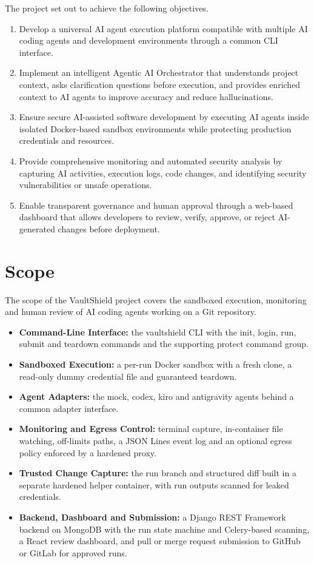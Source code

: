 \documentclass[12pt,a4paper,oneside]{report}
\providecommand{\tightlist}{\setlength{\itemsep}{0pt}\setlength{\parskip}{0pt}}
\begin{document}
The project set out to achieve the following objectives.
\begin{enumerate}
\def\labelenumi{\arabic{enumi}.}
\tightlist
\item
  Develop a universal AI agent execution platform compatible with multiple AI coding agents and development environments through a common CLI interface.
\item
  Implement an intelligent Agentic AI Orchestrator that understands project context, asks clarification questions before execution, and provides enriched context to AI agents to improve accuracy and reduce hallucinations.
\item
  Ensure secure AI-assisted software development by executing AI agents inside isolated Docker-based sandbox environments while protecting production credentials and resources.
\item
  Provide comprehensive monitoring and automated security analysis by capturing AI activities, execution logs, code changes, and identifying security vulnerabilities or unsafe operations.
\item
  Enable transparent governance and human approval through a web-based dashboard that allows developers to review, verify, approve, or reject AI-generated changes before deployment.
\end{enumerate}

\section{Scope}\label{scope}

The scope of the VaultShield project covers the sandboxed execution, monitoring and human review of AI coding agents working on a Git repository.

\begin{itemize}
\tightlist
\item
  \textbf{Command-Line Interface:} the vaultshield CLI with the init, login, run, submit and teardown commands and the supporting protect command group.
\item
  \textbf{Sandboxed Execution:} a per-run Docker sandbox with a fresh clone, a read-only dummy credential file and guaranteed teardown.
\item
  \textbf{Agent Adapters:} the mock, codex, kiro and antigravity agents behind a common adapter interface.
\item
  \textbf{Monitoring and Egress Control:} terminal capture, in-container file watching, off-limits paths, a JSON Lines event log and an optional egress policy enforced by a hardened proxy.
\item
  \textbf{Trusted Change Capture:} the run branch and structured diff built in a separate hardened helper container, with run outputs scanned for leaked credentials.
\item
  \textbf{Backend, Dashboard and Submission:} a Django REST Framework backend on MongoDB with the run state machine and Celery-based scanning, a React review dashboard, and pull or merge request submission to GitHub or GitLab for approved runs.
\end{itemize}
\end{document}
